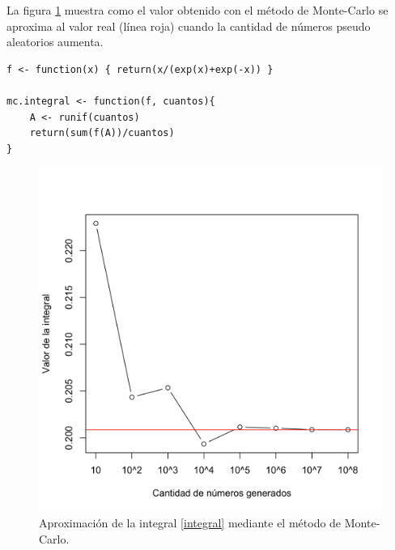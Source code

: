 \documentclass[12pt,letterpaper]{article}
\begin{document}
La figura \ref{im} muestra como el valor obtenido con el método de Monte-Carlo se aproxima al valor real (línea roja) cuando la cantidad de números pseudo aleatorios aumenta.
\begin{lstlisting}[caption = Función para aproximar una integral con el método de Monte-Carlo., label={lst:function}]
f <- function(x) { return(x/(exp(x)+exp(-x)) }

mc.integral <- function(f, cuantos){
    A <- runif(cuantos)
    return(sum(f(A))/cuantos)
}
\end{lstlisting}

\begin{figure}
\centering
\includegraphics[scale=0.3]{int1.png}
\caption{Aproximación de la integral \ref{integral} mediante el método de Monte-Carlo. }
\label{im}
\end{figure}

 

\end{document}
